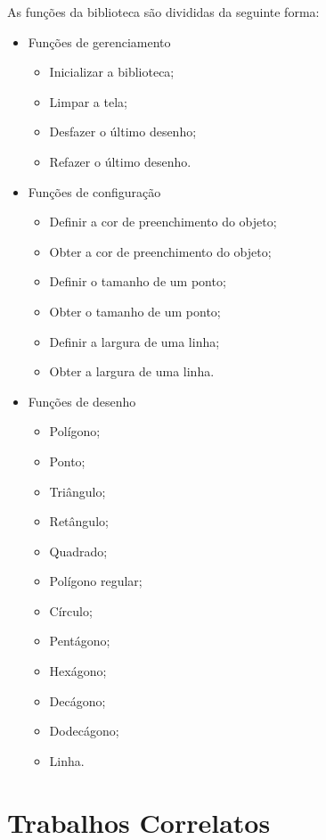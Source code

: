 \documentclass[12pt, %
openright,
oneside, %
a4paper,    %
brazil]{facom-ufu-abntex2}
\begin{document}
As funções da biblioteca são divididas da seguinte forma:
\begin{itemize}

    \item Funções de gerenciamento
    \begin{itemize}
    \item Inicializar a biblioteca;
    \item Limpar a tela;
    \item Desfazer o último desenho;
    \item Refazer o último desenho.
    \end{itemize}

    \item Funções de configuração
    \begin{itemize}
    \item Definir a cor de preenchimento do objeto;
    \item Obter a cor de preenchimento do objeto;
    \item Definir o tamanho de um ponto;
    \item Obter o tamanho de um ponto;
    \item Definir a largura de uma linha;
    \item Obter a largura de uma linha.
    \end{itemize}

    \item Funções de desenho
    \begin{itemize}

    \item Polígono;
    \item Ponto;
    \item Triângulo;
    \item Retângulo;
    \item Quadrado;
    \item Polígono regular;
    \item Círculo;
    \item Pentágono;
    \item Hexágono;
    \item Decágono;
    \item Dodecágono;
    \item Linha.

    \end{itemize}
\end{itemize}

\chapter{Trabalhos Correlatos}
\end{document}
